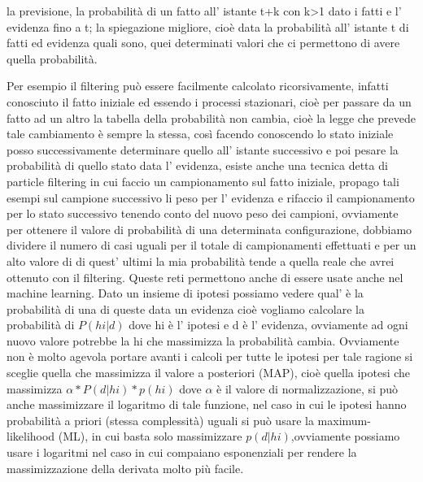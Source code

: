 		la previsione, la probabilità di un fatto all' istante t+k con k>1 dato i fatti e l' evidenza fino a t;
		la spiegazione migliore, cioè data la probabilità all' istante t di fatti ed evidenza quali sono, quei determinati valori che ci permettono di avere quella probabilità.
		\par 
		Per esempio il filtering può essere facilmente calcolato ricorsivamente, infatti conosciuto il fatto iniziale ed essendo i processi stazionari, cioè per passare da un fatto ad un altro la tabella della probabilità non cambia, cioè la legge che prevede tale cambiamento è sempre la stessa, così facendo conoscendo lo stato iniziale posso successivamente determinare quello all' istante successivo e poi pesare la probabilità di quello stato data l' evidenza, esiste anche una tecnica detta di particle filtering in cui faccio un campionamento sul fatto iniziale, propago tali esempi sul campione successivo li peso per l' evidenza e rifaccio il campionamento per lo stato successivo tenendo conto del nuovo peso dei campioni, ovviamente per ottenere il valore di probabilità di una determinata configurazione, dobbiamo dividere il numero di casi uguali per il totale di campionamenti effettuati e per un alto valore di di quest' ultimi la mia probabilità tende a quella reale che avrei ottenuto con il filtering. Queste reti permettono anche di essere usate anche nel machine learning. Dato un insieme di ipotesi possiamo vedere qual' è la probabilità di una di queste data un evidenza cioè vogliamo calcolare la probabilità di $P(hi|d)$ dove hi è l' ipotesi e d è l' evidenza, ovviamente ad ogni nuovo valore potrebbe la hi che massimizza la probabilità cambia. Ovviamente non è molto agevola portare avanti i calcoli per tutte le ipotesi per tale ragione si sceglie quella che massimizza il valore a posteriori (MAP), cioè quella ipotesi che massimizza $\alpha*P(d|hi)*p(hi)$ dove $\alpha$ è il valore di normalizzazione, si può anche massimizzare il logaritmo di tale funzione, nel caso in cui le ipotesi hanno probabilità a priori (stessa complessità) uguali si può usare la maximum-likelihood (ML), in cui basta solo massimizzare $p(d|hi)$,ovviamente possiamo usare i logaritmi nel caso in cui compaiano esponenziali per rendere la massimizzazione della derivata molto più facile.
		
